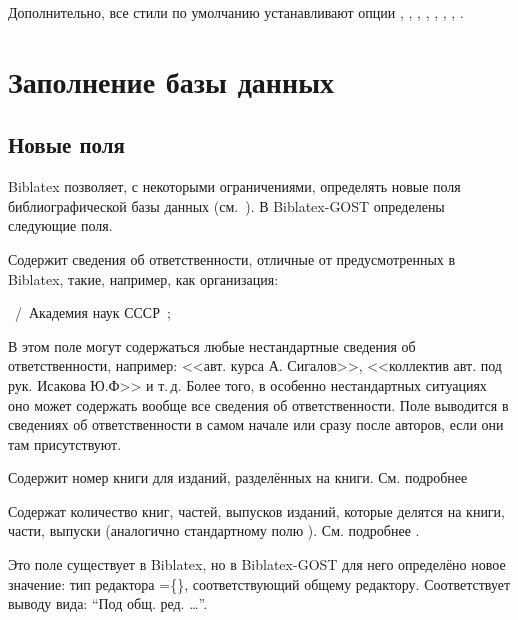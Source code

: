 \documentclass[11pt,a4paper,headings=small,numbers=enddot]{ltxdockit}[2011/03/25]
\newcommand*{\biblatex}{Biblatex\xspace}
\newcommand*{\biblatexgost}{Biblatex-GOST\xspace}
\renewcommand*{\apxref}{\refs{прил.}{прил.}}
\newenvironment{bibexample}{\begin{list}{}{}}{\end{list}}
\begin{document}
Дополнительно, все стили по умолчанию устанавливают опции 
,
,
,
,
,
,
,
.

\section{Заполнение базы данных}
\label{sec:database}


\subsection{Новые поля}
\label{sec:fields}

\biblatex позволяет, с некоторыми ограничениями, определять новые поля библиографической
базы данных (см.~\apxref{bibermap}). В \biblatexgost определены следующие поля. 

\begin{fieldlist}


Содержит сведения об ответственности, отличные от предусмотренных в \biblatex, 
такие, например, как организация:

\begin{bibexample}
\item \textellipsis\ \slash\ Академия наук СССР\ ;\ \textellipsis
\end{bibexample}

В этом поле могут содержаться любые нестандартные сведения об ответственности,
например: <<авт. курса А. Сигалов>>,
<<коллектив авт. под рук. Исакова Ю.Ф>> и т.\,д. 
Более того, в особенно нестандартных ситуациях
оно может содержать вообще все сведения об ответственности. 
Поле  выводится в сведениях об ответственности в самом начале или 
сразу после авторов, если они там присутствуют. 


Содержит номер книги для изданий, разделённых на книги. См. подробнее


Содержат количество книг, частей, выпусков изданий, 
которые делятся на книги, части, выпуски (аналогично стандартному полю ). См.
подробнее .


Это поле существует в \biblatex, но в \biblatexgost для него определёно новое значение: 
тип редактора =\{\}, соответствующий общему 
редактору. Соответствует выводу вида: \enquote{Под общ. ред. \ldots}.

\end{fieldlist}
\end{document}
